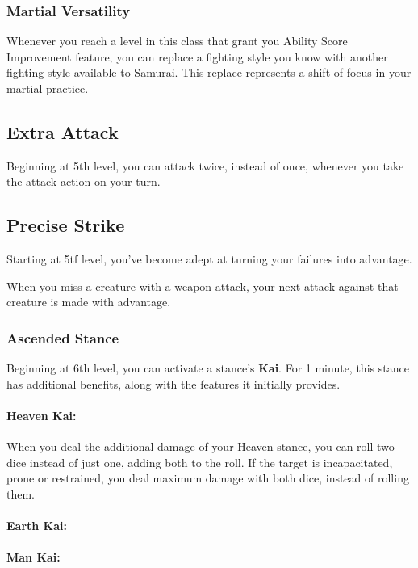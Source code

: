\documentclass[letterpaper,twocolumn,openany,nodeprecatedcode]{dndbook}
\begin{document}
\subsubsection{Martial Versatility}
Whenever you reach a level in this class that grant you Ability Score Improvement feature, you can replace a fighting style you know with another
fighting style available to Samurai. This replace represents a shift of focus in your martial practice.

\subsection{Extra Attack}
Beginning at 5th level, you can attack twice, instead of once, whenever you take the attack action on your turn.

\subsection{Precise Strike}
Starting at 5tf level, you've become adept at turning your failures into advantage.
\vspace{\baselineskip}

\noindent When you miss a creature with a weapon attack, your next attack against that creature is made with advantage.

\subsubsection{Ascended Stance}
Beginning at 6th level, you can activate a stance's \textbf{Kai}. For 1 minute, this stance has additional benefits, along with the features it initially provides.
\vspace{\baselineskip}

\paragraph{Heaven Kai:} When you deal the additional damage of your Heaven stance, you can roll two dice instead of just one, adding both to the roll. If the target is incapacitated, prone or restrained, you deal maximum damage with both dice, instead of rolling them.
\vspace{\baselineskip}
\paragraph{Earth Kai:}
\vspace{\baselineskip}
\paragraph{Man Kai:}
\end{document}
